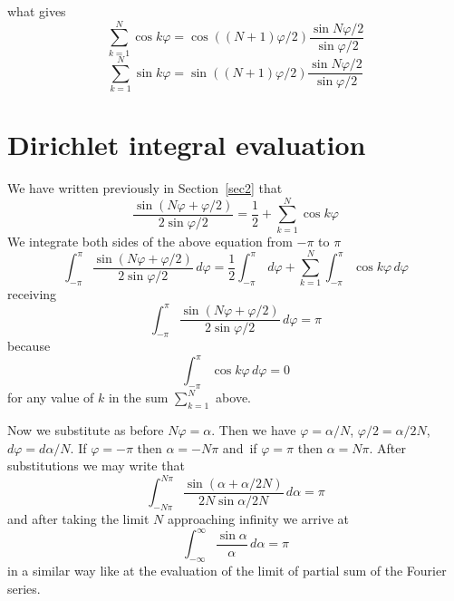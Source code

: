 \documentclass[12pt]{amsart}
\theoremstyle{definition}
\numberwithin{equation}{section}
\begin{document}
what gives
\begin{equation}
    \sum_{k=1}^{N} \cos k \varphi = 
    \cos((N+1) \varphi/2) \frac{\sin N \varphi/2}{\sin \varphi/2}
\end{equation}
\begin{equation}
    \sum_{k=1}^{N} \sin k \varphi = 
    \sin((N+1) \varphi/2) \frac{\sin N \varphi/2}{\sin \varphi/2}
\end{equation}



\section{Dirichlet integral evaluation}
\label{sec-Dirichlet_integral_evaluation}



We have written previously in Section~\ref{sec2} that
\begin{equation}
\frac{\sin(N\varphi+\varphi/2)}{2 \sin \varphi/2}
=
\frac{1}{2} + \sum_{k=1}^{N} \cos k \varphi 
\end{equation}
We integrate both sides of the above equation from $-\pi$ to $\pi$
\begin{equation}
\int_{-\pi}^{\pi} \frac{\sin(N\varphi+\varphi/2)}{2 \sin \varphi/2} \, d\varphi
=
\frac{1}{2} \int_{-\pi}^{\pi}  \, d\varphi + \sum_{k=1}^{N}  \int_{-\pi}^{\pi} \cos k \varphi   \, d\varphi
\end{equation}
receiving
\begin{equation}
\int_{-\pi}^{\pi} \frac{\sin(N\varphi+\varphi/2)}{2 \sin \varphi/2} \, d\varphi
=
\pi
\end{equation}
because
\begin{equation}
\int_{-\pi}^{\pi} \cos k \varphi   \, d\varphi = 0
\end{equation}
for any value of $k$ in the sum $\sum_{k=1}^{N}$ above.

Now we substitute as before
$N\varphi=\alpha$\@. Then we have $\varphi=\alpha/N$, $\varphi/2=\alpha/2N$, $d\varphi=d\alpha/N$\@.
If $\varphi=-\pi$ then \newline $\alpha=-N\pi$ and~if $\varphi=\pi$ then $\alpha=N\pi$\@.
After substitutions we may write that
\begin{equation}
\int_{-N\pi}^{N\pi} \frac{\sin(\alpha+\alpha/2N)}{2N \sin \alpha/2N} \, d\alpha  
= \pi
\end{equation}
and after taking the limit $N$ approaching infinity we arrive at
\begin{equation}
\int_{-\infty}^{\infty} \frac{\sin \alpha}{\alpha} \, d\alpha = \pi
\end{equation}
in a similar way like at the evaluation of the limit of partial sum of the Fourier series.
\end{document}
